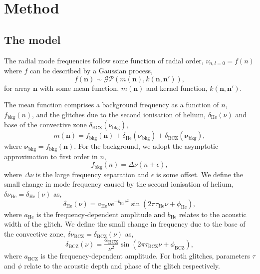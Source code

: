 \documentclass[linenumbers,modern]{aastex631}
\newcommand{\helium}{\mathrm{He}}
\newcommand{\bcz}{\mathrm{BCZ}}
\newcommand{\bkg}{\mathrm{bkg}}
\begin{document}
\section{Method} \label{sec:method}

\subsection{The model} \label{sec:model}

The radial mode frequencies follow some function of radial order, \(\nu_{n,l=0}
= f(n)\) where \(f\) can be described by a Gaussian process,
%
\begin{equation}
    f(\bm n) \sim \mathcal{GP}\left(m(\bm n), k(\bm n, \bm n')\right),
\end{equation}
%
for array \(\bm n\) with some mean function, \(m(\bm n)\) and kernel function,
\(k(\bm n, \bm n')\).

The mean function comprises a background frequency as a function of \(n\),
\(f_\bkg(n)\), and the glitches due to the second ionisation of helium,
\(\delta_\helium(\nu)\) and base of the convective zone
\(\delta_\bcz(\nu_\bkg)\),
%
\begin{equation}
    m(\bm n) = f_\bkg(\bm n) + \delta_\helium(\bm\nu_\bkg) +
    \delta_\bcz(\bm\nu_\bkg),
\end{equation}
%
where \(\bm\nu_\bkg = f_\bkg(\bm n)\). For the background, we adopt the
asymptotic approximation to first order in \(n\),
%
\begin{equation}
    f_\bkg(n) = \Delta\nu (n + \epsilon),
\end{equation}
%
where \(\Delta\nu\) is the large frequency separation and \(\epsilon\) is some
offset. We define the small change in mode frequency caused by the second
ionisation of helium, \(\delta\nu_\helium = \delta_\helium(\nu)\) as,
%
\begin{equation}
    \delta_\helium(\nu) = a_\helium \nu e^{- b_\helium \nu^2}
    \sin\left( 2 \pi \tau_\helium \nu + \phi_\helium \right),
\end{equation}
%
where \(a_\helium\) is the frequency-dependent amplitude and \(b_\helium\)
relates to the acoustic width of the glitch. We define the small change in
frequency due to the base of the convective zone,
\(\delta\nu_\bcz = \delta_\bcz(\nu)\) as,
%
\begin{equation}
    \delta_\bcz(\nu) = \frac{a_\bcz}{\nu^2}
    \sin\left( 2 \pi \tau_\bcz \nu + \phi_\bcz \right),
\end{equation}
%
where \(a_\bcz\) is the frequency-dependent amplitude. For both glitches,
parameters \(\tau\) and \(\phi\) relate to the acoustic depth and phase of
the glitch respectively.
\end{document}
